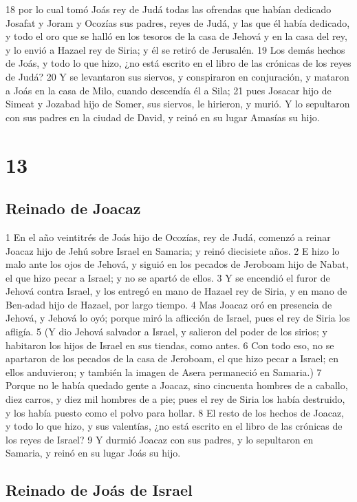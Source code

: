 18 por lo cual tomó Joás rey de Judá todas las ofrendas que habían dedicado Josafat y Joram y Ocozías sus padres, reyes de Judá, y las que él había dedicado, y todo el oro que se halló en los tesoros de la casa de Jehová y en la casa del rey, y lo envió a Hazael rey de Siria; y él se retiró de Jerusalén.
19 Los demás hechos de Joás, y todo lo que hizo, ¿no está escrito en el libro de las crónicas de los reyes de Judá?
20 Y se levantaron sus siervos, y conspiraron en conjuración, y mataron a Joás en la casa de Milo, cuando descendía él a Sila;
21 pues Josacar hijo de Simeat y Jozabad hijo de Somer, sus siervos, le hirieron, y murió. Y lo sepultaron con sus padres en la ciudad de David, y reinó en su lugar Amasías su hijo.

\chapter{13}

\section*{Reinado de Joacaz}


1 En el año veintitrés de Joás hijo de Ocozías, rey de Judá, comenzó a reinar Joacaz hijo de Jehú sobre Israel en Samaria; y reinó diecisiete años.
2 E hizo lo malo ante los ojos de Jehová, y siguió en los pecados de Jeroboam hijo de Nabat, el que hizo pecar a Israel; y no se apartó de ellos.
3 Y se encendió el furor de Jehová contra Israel, y los entregó en mano de Hazael rey de Siria, y en mano de Ben-adad hijo de Hazael, por largo tiempo.
4 Mas Joacaz oró en presencia de Jehová, y Jehová lo oyó; porque miró la aflicción de Israel, pues el rey de Siria los afligía.
5 (Y dio Jehová salvador a Israel, y salieron del poder de los sirios; y habitaron los hijos de Israel en sus tiendas, como antes.
6 Con todo eso, no se apartaron de los pecados de la casa de Jeroboam, el que hizo pecar a Israel; en ellos anduvieron; y también la imagen de Asera permaneció en Samaria.)
7 Porque no le había quedado gente a Joacaz, sino cincuenta hombres de a caballo, diez carros, y diez mil hombres de a pie; pues el rey de Siria los había destruido, y los había puesto como el polvo para hollar.
8 El resto de los hechos de Joacaz, y todo lo que hizo, y sus valentías, ¿no está escrito en el libro de las crónicas de los reyes de Israel?
9 Y durmió Joacaz con sus padres, y lo sepultaron en Samaria, y reinó en su lugar Joás su hijo.
\section*{Reinado de Joás de Israel}

